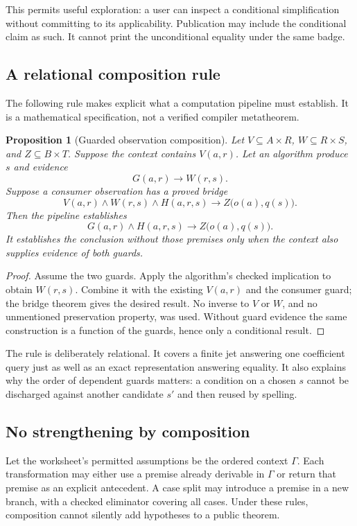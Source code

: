 \documentclass[11pt,a4paper]{article}
\newtheorem{proposition}{Proposition}[section]
\theoremstyle{definition}
\begin{document}
This permits useful exploration: a user can inspect a conditional simplification
without committing to its applicability. Publication may include the conditional
claim as such. It cannot print the unconditional equality under the same badge.

\subsection{A relational composition rule}
The following rule makes explicit what a computation pipeline must establish.
It is a mathematical specification, not a verified compiler metatheorem.

\begin{proposition}[Guarded observation composition]
Let $V\subseteq A\times R$, $W\subseteq R\times S$, and
$Z\subseteq B\times T$. Suppose the context contains $V(a,r)$. Let an
algorithm produce $s$ and evidence
\[
 G(a,r)\longrightarrow W(r,s).
\]
Suppose a consumer observation has a proved bridge
\[
 V(a,r)\land W(r,s)\land H(a,r,s)
 \longrightarrow Z\bigl(o(a),q(s)\bigr).
\]
Then the pipeline establishes
\[
 G(a,r)\land H(a,r,s)
 \longrightarrow Z\bigl(o(a),q(s)\bigr).
\]
It establishes the conclusion without those premises only when the context
also supplies evidence of both guards.
\end{proposition}
\begin{proof}
Assume the two guards. Apply the algorithm's checked implication to obtain
$W(r,s)$. Combine it with the existing $V(a,r)$ and the consumer guard; the
bridge theorem gives the desired result. No inverse to $V$ or $W$, and no
unmentioned preservation property, was used. Without guard evidence the same
construction is a function of the guards, hence only a conditional result.
\end{proof}

The rule is deliberately relational. It covers a finite jet answering one
coefficient query just as well as an exact representation answering equality.
It also explains why the order of dependent guards matters: a condition on a
chosen $s$ cannot be discharged against another candidate $s'$ and then reused
by spelling.

\subsection{No strengthening by composition}
Let the worksheet's permitted assumptions be the ordered context $\Gamma$.
Each transformation may either use a premise already derivable in $\Gamma$ or
return that premise as an explicit antecedent. A case split may introduce a
premise in a new branch, with a checked eliminator covering all cases. Under
these rules, composition cannot silently add hypotheses to a public theorem.
\end{document}
